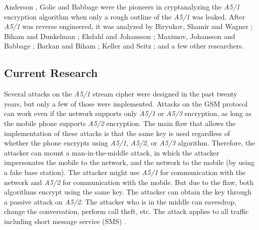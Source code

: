 \documentclass{llncs}
\begin{document}
Anderson \cite{[And]}, Golic \cite{[Golic]} and Babbage \cite{[Bab]} were the pioneers in cryptanalyzing the \emph {A5/1} encryption algorithm when only a rough outline of the \emph {A5/1} was leaked. After \emph {A5/1} was reverse engineered, it was analyzed by Biryukov, Shamir and Wagner \cite{[Bir]}; Biham and Dunkelman \cite{[BD]}; Ekdahl and Johansson \cite{[Ek]}; Maximov, Johansson and Babbage \cite{[Max]}; Barkan and Biham \cite{[Bar]}; Keller and Seitz \cite{[KS01]}; and a few other researchers. 

\subsection{Current Research}
Several attacks on the \emph {A5/1} stream cipher were designed in the past twenty years, but only a few of those were implemented. Attacks on the GSM protocol can work even if the network supports only \emph {A5/1} or \emph {A5/3} encryption, as long as the mobile phone supports \emph {A5/2} encryption. The main flaw that allows the implementation of these attacks is that the same key is used regardless of whether the phone encrypts using \emph {A5/1}, \emph {A5/2}, or \emph {A5/3} algorithm. Therefore, the attacker can mount a man-in-the-middle attack, in which the attacker impersonates the mobile to the network, and the network to the mobile (by using a fake base station). The attacker might use \emph {A5/1} for communication with the network and \emph {A5/2} for communication with the mobile. But due to the flaw, both algorithms encrypt using the same key. The attacker can obtain the key through a passive attack on \emph {A5/2}. The attacker who is in the middle can eavesdrop, change the conversation, perform call theft, etc. The attack applies to all traffic including short message service (SMS) \cite{[Bar]}.
\end{document}
